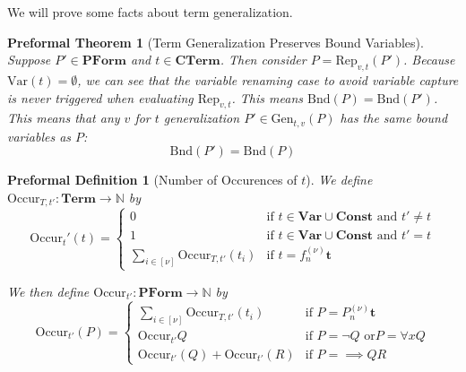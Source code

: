 \documentclass[oneside, 12pt]{book}
\theoremstyle{break}
\newtheorem{preformal definition}[definition]{Preformal Definition}
\newtheorem{preformal theorem}[theorem]{Preformal Theorem}
\newcommand{\bv}[1]{\boldsymbol{#1}}
\newcommand{\N}[0]{\mathbb{N}}
\begin{document}
		We will prove some facts about term generalization.
		\begin{preformal theorem}[Term Generalization Preserves Bound Variables]
			Suppose $P' \in \textbf{PForm}$ and $t \in \textbf{CTerm}$.
			Then consider $P = \text{Rep}_{v, t}(P')$.
			Because $\text{Var}(t) = \emptyset$, we can see that the variable renaming case to avoid variable capture is never triggered when evaluating $\text{Rep}_{v, t}$.
			This means $\text{Bnd}(P) = \text{Bnd}(P')$.
			This means that any $v$ for $t$ generalization $P'\in \text{Gen}_{t, v}(P)$ has the same bound variables as $P$:
			\begin{equation*}
				\text{Bnd}(P') = \text{Bnd}(P)
			\end{equation*}
		\end{preformal theorem}
		
		\begin{preformal definition}[Number of Occurences of $t$]
			We define $\text{Occur}_{T, t'}: \textbf{Term} \to \N$ by
			\begin{equation*}
				\text{Occur}_t'(t) = \begin{cases}
					0 & \text{if } t \in \textbf{Var} \cup \textbf{Const} \text{ and } t'\neq t\\
					1 & \text{if } t \in \textbf{Var}\cup \textbf{Const} \text{ and } t' = t\\
					\sum_{i \in [\nu]} \text{Occur}_{T, t'}(t_i) &\text{if } t = f_n^{(\nu)}\bv{t} 
				\end{cases}
			\end{equation*}
			
			We then define $\text{Occur}_{t'} : \textbf{PForm} \to \N$ by
			\begin{equation*}
				\text{Occur}_{t'}(P) = \begin{cases}
					\sum_{i \in [\nu]} \text{Occur}_{T, t'}(t_i) & \text{if } P = P_n^{(\nu)} \bv{t}\\
					\text{Occur}_{t'}Q & \text{if } P = \lnot Q \text{ or} P = \forall x Q\\
					\text{Occur}_{t'}(Q) + \text{Occur}_{t'}(R) & \text{if } P = \implies QR
				\end{cases}
			\end{equation*}
			
		\end{preformal definition}
		
\end{document}
